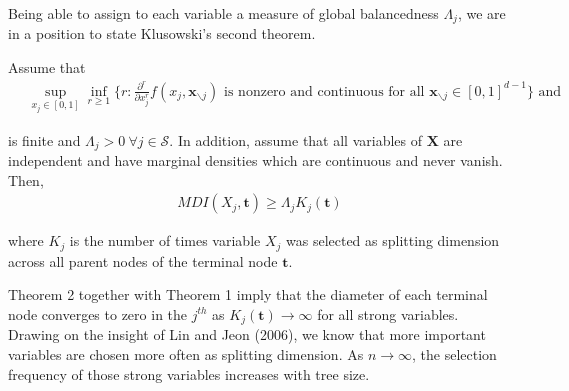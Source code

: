 Being able to assign to each variable a measure of global balancedness $\Lambda_j$, we are in a position to state Klusowski's second theorem.

\begin{theorem}
    Assume that 
    \begin{align}
        \quad \sup_{x_j \in [0,1]} \inf_{r \geq 1} \{ r: \frac{\partial^r}{\partial x^r_j} f(x_j, \mathbf{x}_{\backslash j}) \text{ is nonzero and continuous for all } \mathbf{x}_{\backslash j} \in [0, 1]^{d-1} \} \text{ and} \label{assumption_theorem2}
    \end{align}

    is finite and $\Lambda_j > 0 \ \forall j \in \mathcal{S}$. In addition, assume that all variables of $\mathbf{X}$ are independent and have marginal densities which are continuous and never vanish. Then, 
    \begin{align}
        MDI(X_j, \mathbf{t}) \geq \Lambda_j K_j(\mathbf{t}) \label{theorem2}
    \end{align}

    where $K_j$ is the number of times variable $X_j$ was selected as splitting dimension across all parent nodes of the terminal node $\mathbf{t}$.
\end{theorem}

Theorem 2 together with Theorem 1 imply that the diameter of each terminal node converges to zero in the $j^{th}$ as $K_j(\mathbf{t}) \rightarrow \infty$ for all strong variables. Drawing on the insight of Lin and Jeon (2006), we know that more important variables are chosen more often as splitting dimension. As $n \rightarrow \infty$, the selection frequency of those strong variables increases with tree size. 


